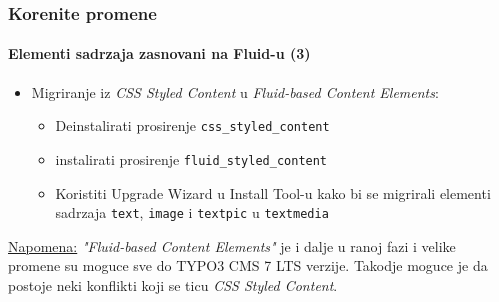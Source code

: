 \begin{frame}[fragile]
	\frametitle{Korenite promene}
	\framesubtitle{Elementi sadrzaja zasnovani na Fluid-u (3)}

	\begin{itemize}

		\item Migriranje iz \textit{CSS Styled Content} u \textit{Fluid-based Content Elements}:

			\begin{itemize}

				\item Deinstalirati prosirenje \texttt{css\_styled\_content}

				\item instalirati prosirenje \texttt{fluid\_styled\_content}

				\item Koristiti Upgrade Wizard u Install Tool-u kako bi se migrirali elementi sadrzaja
					\texttt{text}, \texttt{image} i \texttt{textpic} u \texttt{textmedia}

			\end{itemize}
	\end{itemize}

	\vspace{1.4cm}

	\begingroup
		\color{red}
			\small
				\underline{Napomena:} \textit{"Fluid-based Content Elements"} je i dalje u ranoj fazi i velike promene su moguce sve do TYPO3 CMS 7 LTS verzije. Takodje moguce je da postoje neki konflikti koji se ticu \textit{CSS Styled Content}.
			\normalsize
	\endgroup

\end{frame}



